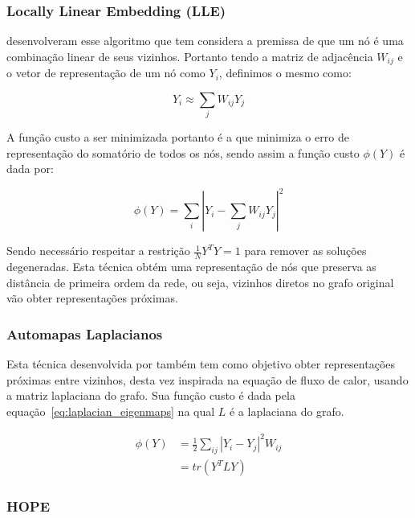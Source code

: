 \subsubsection{Locally Linear Embedding (LLE)}

\citet{roweis00} desenvolveram esse algoritmo que tem considera a premissa de que
um nó é uma combinação linear de seus vizinhos.
Portanto tendo a matriz de adjacência $W_{ij}$ e o vetor de representação de um
nó como $Y_i$, definimos o mesmo como:

\begin{equation}
    Y_i \approx \sum_j{W_{ij}Y_j}
\end{equation}

A função custo a ser minimizada portanto é a que minimiza o erro de representação
do somatório de todos os nós, sendo assim a função custo $\phi(Y)$
é dada por:

\begin{equation}
    \phi(Y) = \sum_i{|Y_i - \sum_j{W_{ij}Y_j}|^2}
\end{equation}

Sendo necessário respeitar a restrição $\frac{1}{N}Y^TY = 1$ para remover as
soluções degeneradas.
Esta técnica obtém uma representação de nós que preserva as distância de
primeira ordem da rede, ou seja, vizinhos diretos no grafo original vão obter
representações próximas.

\subsubsection{Automapas Laplacianos}

Esta técnica desenvolvida por \citet{belkin02} também tem como objetivo obter
representações próximas entre vizinhos, desta vez inspirada na equação de fluxo
de calor, usando a matriz laplaciana do grafo.
Sua função custo é dada pela equação~\ref{eq:laplacian_eigenmaps} na qual $L$ é
a laplaciana do grafo.

\begin{equation} \label{eq:laplacian_eigenmaps}
\begin{aligned}
    \phi(Y) &= \frac{1}{2} \sum_{ij}{|Y_i - Y_j|^2 W_{ij}} \\
            &= tr(Y^TLY)
\end{aligned}
\end{equation}

\subsubsection{HOPE}

